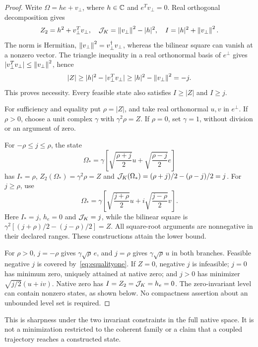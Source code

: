 \begin{proof}
Write $\Omega=he+v_\perp$, where $h\in\mathbb C$ and $e^Tv_\perp=0$. Real orthogonal decomposition gives
\begin{equation}\label{eq:decomposition}%
Z_2=h^2+v_\perp^Tv_\perp,\quad
\Jk=\norm{v_\perp}^2-|h|^2,\quad
I=|h|^2+\norm{v_\perp}^2 .
\end{equation}
The norm is Hermitian, $\left\|v_\perp\right\|^2=v_\perp^\dagger v_\perp$, whereas the bilinear square can vanish at a nonzero vector. The triangle inequality in a real orthonormal basis of $e^\perp$ gives $|v_\perp^Tv_\perp|\le\left\|v_\perp\right\|^2$, hence
\begin{equation}\label{eq:feasibility}%
|Z|\ge |h|^2-|v_\perp^Tv_\perp|
\ge |h|^2-\norm{v_\perp}^2=-j .
\end{equation}
This proves necessity. Every feasible state also satisfies $I\ge|Z|$ and $I\ge j$.

For sufficiency and equality put $\rho=|Z|$, and take real orthonormal $u,v$ in $e^\perp$. If $\rho>0$, choose a unit complex $\gamma$ with $\gamma^2\rho=Z$. If $\rho=0$, set $\gamma=1$, without division or an argument of zero.

For $-\rho\le j\le\rho$, the state
\begin{equation}\label{eq:equalityone}%
\Omega_*=\gamma\left[
\sqrt{\frac{\rho+j}{2}}u+\sqrt{\frac{\rho-j}{2}}e\right]
\end{equation}
has $I_*=\rho$, $Z_2(\Omega_*)=\gamma^2\rho=Z$ and
$\mathcal J_K(\Omega_*)=(\rho+j)/2-(\rho-j)/2=j$.
For $j\ge\rho$, use
\begin{equation}\label{eq:equalitytwo}%
\Omega_*=\gamma\left[
\sqrt{\frac{j+\rho}{2}}u+i\sqrt{\frac{j-\rho}{2}}v\right].
\end{equation}
Here $I_*=j$, $h_e=0$ and $\mathcal J_K=j$, while the bilinear square is
$\gamma^2[(j+\rho)/2-(j-\rho)/2]=Z$. All square-root arguments are nonnegative in their declared ranges. These constructions attain the lower bound.

For $\rho>0$, $j=-\rho$ gives $\gamma\sqrt\rho\,e$, and $j=\rho$ gives $\gamma\sqrt\rho\,u$ in both branches. Feasible negative $j$ is covered by~\eqref{eq:equalityone}. If $Z=0$, negative $j$ is infeasible; $j=0$ has minimum zero, uniquely attained at native zero; and $j>0$ has minimizer $\sqrt{j/2}(u+iv)$. Native zero has $I=Z_2=\mathcal J_K=h_e=0$. The zero-invariant level can contain nonzero states, as shown below. No compactness assertion about an unbounded level set is required.
\end{proof}
This is sharpness under the two invariant constraints in the full native space. It is not a minimization restricted to the coherent family or a claim that a coupled trajectory reaches a constructed state.

